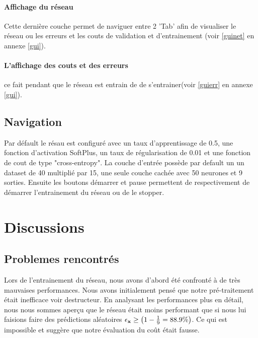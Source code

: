 \documentclass[11pt]{article}
\begin{document}
\paragraph{Affichage du r\'eseau} Cette derni\`ere couche permet de naviguer
entre 2 'Tab' afin de visualiser le r\'eseau ou les erreurs et les couts de
validation et d'entrainement (voir \ref{guinet} en annexe \ref{gui}).
\paragraph{L'affichage des couts et des erreurs} ce fait pendant que le
r\'eseau est entrain de de s'entrainer(voir \ref{guierr} en annexe \ref{gui}).

\subsection{Navigation}
Par d\'efault le r\'esau est configur\'e avec un taux d'apprentissage de 0.5,
une fonction d'activation SoftPlus, un taux de r\'egularisation de 0.01 et une
fonction de cout de type "cross-entropy". La couche d'entr\'ee poss\`ede par
default un un dataset de 40 multipli\'e par 15, une seule couche cach\'ee avec
50 neurones et 9 sorties. Ensuite les boutons d\'emarrer et pause permettent
de respectivement de d\'emarrer l'entrainement du r\'eseau ou de le stopper.



\section{Discussions}
\subsection{Problemes rencontr\'es}
Lors de l'entrainement du r\'eseau, nous avons d'abord \'et\'e confront\'e \`a
de tr\`es mauvaises performances. Nous avons initialement pens\'e que notre
pr\'e-traitement \'etait inefficace voir destructeur. En analysant les
performances plus en d\'etail,
nous nous sommes aper\c cu que le r\'eseau \'etait moins performant que si
nous lui faisions faire des pr\'edictions al\'eatoires
$\epsilon_{\bf x} \ge \left (1 - \frac{1}{9} = 88.9\% \right)$.
Ce qui est impossible et sugg\`ere que notre \'evaluation du co\^ut \'etait fausse.
\end{document}
